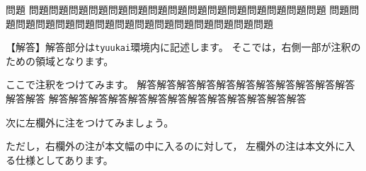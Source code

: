 {\hidarityuukeisentrue
\begin{itembox}{問題}
問題問題問題問題問題問題問題問題問題問題問題問題問題問題問題
問題問題問題問題問題問題問題問題問題問題問題問題問題問題問題
\end{itembox}
\begin{tyuukai}
【解答】解答部分は\verb+tyuukai+環境内に記述します。
そこでは，右側一部が注釈のための領域となります。

ここで注釈をつけてみます。
解答解答解答解答解答解答解答解答解答解答解答解答解答
解答解答解答解答解答解答解答解答解答解答解答解答解答

次に左欄外に注をつけてみましょう。

ただし，右欄外の注が本文幅の中に入るのに対して，
左欄外の注は本文外に入る仕様としてあります。
\end{tyuukai}}
